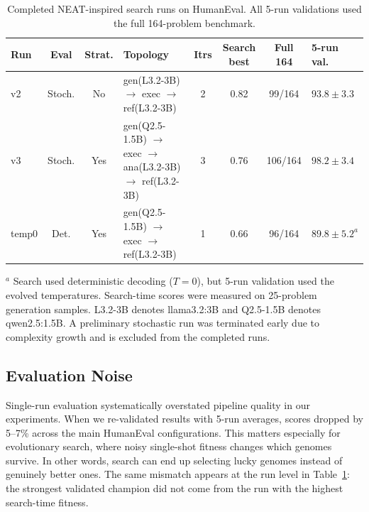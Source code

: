 \documentclass{article}
\begin{document}
\begin{table}[t]
\centering
\caption{Completed NEAT-inspired search runs on HumanEval. All 5-run validations used the full 164-problem benchmark.}
\label{tab:neat-runs}
\small
\setlength{\tabcolsep}{3pt}
\begin{tabularx}{\linewidth}{@{}lccXcccl@{}}
\toprule
\textbf{Run} & \textbf{Eval} & \textbf{Strat.} & \textbf{Topology} & \textbf{Itrs} & \textbf{Search best} & \textbf{Full 164} & \textbf{5-run val.} \\
\midrule
v2 & Stoch. & No &
gen(L3.2-3B) \newline $\rightarrow$ exec \newline $\rightarrow$ ref(L3.2-3B)
& 2 & 0.82 & 99/164 & $93.8 \pm 3.3$ \\

v3 & Stoch. & Yes &
gen(Q2.5-1.5B) \newline $\rightarrow$ exec \newline $\rightarrow$ ana(L3.2-3B) \newline $\rightarrow$ ref(L3.2-3B)
& 3 & 0.76 & 106/164 & $98.2 \pm 3.4$ \\

temp0 & Det. & Yes &
gen(Q2.5-1.5B) \newline $\rightarrow$ exec \newline $\rightarrow$ ref(L3.2-3B)
& 1 & 0.66 & 96/164 & $89.8 \pm 5.2^{a}$ \\
\bottomrule
\end{tabularx}

\vspace{1mm}
\footnotesize{$^{a}$ Search used deterministic decoding ($T{=}0$), but 5-run validation used the evolved temperatures. Search-time scores were measured on 25-problem generation samples. L3.2-3B denotes llama3.2:3B and Q2.5-1.5B denotes qwen2.5:1.5B. A preliminary stochastic run was terminated early due to complexity growth and is excluded from the completed runs.}
\end{table}

\subsection{Evaluation Noise}
Single-run evaluation systematically overstated pipeline quality in our experiments. When we re-validated results with 5-run averages, scores dropped by 5--7\% across the main HumanEval configurations. This matters especially for evolutionary search, where noisy single-shot fitness changes which genomes survive. In other words, search can end up selecting lucky genomes instead of genuinely better ones. The same mismatch appears at the run level in Table~\ref{tab:neat-runs}: the strongest validated champion did not come from the run with the highest search-time fitness.
\end{document}
